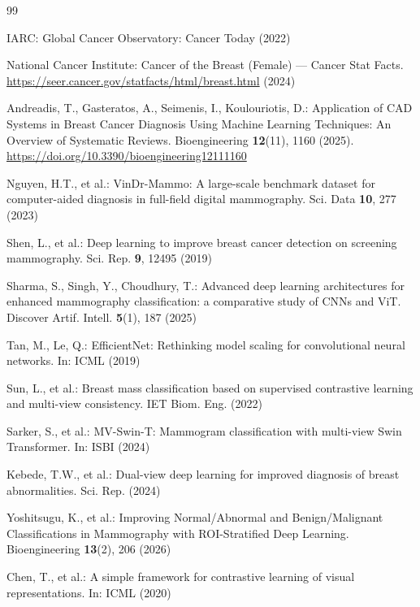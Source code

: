 \documentclass[runningheads]{llncs}
\begin{document}
\begin{thebibliography}{99}

IARC: Global Cancer Observatory: Cancer Today (2022)

National Cancer Institute: Cancer of the Breast (Female) --- Cancer Stat Facts. \url{https://seer.cancer.gov/statfacts/html/breast.html} (2024)

Andreadis, T., Gasteratos, A., Seimenis, I., Koulouriotis, D.: Application of CAD Systems in Breast Cancer Diagnosis Using Machine Learning Techniques: An Overview of Systematic Reviews. Bioengineering \textbf{12}(11), 1160 (2025). \url{https://doi.org/10.3390/bioengineering12111160}

Nguyen, H.T., et al.: VinDr-Mammo: A large-scale benchmark dataset for computer-aided diagnosis in full-field digital mammography. Sci. Data \textbf{10}, 277 (2023)

Shen, L., et al.: Deep learning to improve breast cancer detection on screening mammography. Sci. Rep. \textbf{9}, 12495 (2019)


Sharma, S., Singh, Y., Choudhury, T.: Advanced deep learning architectures for enhanced mammography classification: a comparative study of CNNs and ViT. Discover Artif. Intell. \textbf{5}(1), 187 (2025)

Tan, M., Le, Q.: EfficientNet: Rethinking model scaling for convolutional neural networks. In: ICML (2019)

Sun, L., et al.: Breast mass classification based on supervised contrastive learning and multi-view consistency. IET Biom. Eng. (2022)

Sarker, S., et al.: MV-Swin-T: Mammogram classification with multi-view Swin Transformer. In: ISBI (2024)

Kebede, T.W., et al.: Dual-view deep learning for improved diagnosis of breast abnormalities. Sci. Rep. (2024)

Yoshitsugu, K., et al.: Improving Normal/Abnormal and Benign/Malignant Classifications in Mammography with ROI-Stratified Deep Learning. Bioengineering \textbf{13}(2), 206 (2026)

Chen, T., et al.: A simple framework for contrastive learning of visual representations. In: ICML (2020)


\end{thebibliography}
\end{document}
